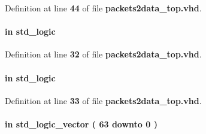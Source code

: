 Definition at line {\bf 44} of file {\bf packets2data\+\_\+top.\+vhd}.

\paragraph[{rclk}]{ {\bfseries \textcolor{keywordflow}{in}\textcolor{vhdlchar}{ }} {\bfseries \textcolor{comment}{std\+\_\+logic}\textcolor{vhdlchar}{ }} \hspace{0.3cm}{\ttfamily [Port]}}\label{classpackets2data__top_adc5af5020d304d578fa740a33045fec7}


Definition at line {\bf 32} of file {\bf packets2data\+\_\+top.\+vhd}.

\paragraph[{reset\+\_\+n}]{ {\bfseries \textcolor{keywordflow}{in}\textcolor{vhdlchar}{ }} {\bfseries \textcolor{comment}{std\+\_\+logic}\textcolor{vhdlchar}{ }} \hspace{0.3cm}{\ttfamily [Port]}}\label{classpackets2data__top_a446ea52ed8c4a84181a47d9165ce41a5}


Definition at line {\bf 33} of file {\bf packets2data\+\_\+top.\+vhd}.

\paragraph[{sample\+\_\+nr}]{ {\bfseries \textcolor{keywordflow}{in}\textcolor{vhdlchar}{ }} {\bfseries \textcolor{comment}{std\+\_\+logic\+\_\+vector}\textcolor{vhdlchar}{ }\textcolor{vhdlchar}{(}\textcolor{vhdlchar}{ }\textcolor{vhdlchar}{ } \textcolor{vhdldigit}{63} \textcolor{vhdlchar}{ }\textcolor{keywordflow}{downto}\textcolor{vhdlchar}{ }\textcolor{vhdlchar}{ } \textcolor{vhdldigit}{0} \textcolor{vhdlchar}{ }\textcolor{vhdlchar}{)}\textcolor{vhdlchar}{ }} \hspace{0.3cm}{\ttfamily [Port]}}\label{classpackets2data__top_a2d4bde289952a99fea4480767d5d30cb}


